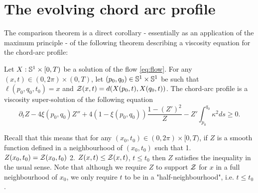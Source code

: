 \documentclass[a4paper, 12pt]{amsart}
\begin{document}
\section{The evolving chord arc profile}
\label{sec:evolving_chordarc}

The comparison theorem is a direct corollary - essentially as an application of the maximum principle - of the following theorem describing a viscosity equation for the chord-arc profile:

\begin{thm}
\label{thm:viscosity}
Let $X: \S^1\times [0,T)$ be a solution of the flow \eqref{eq:flow}. For any $(x,t) \in (0,2\pi)\times (0, T)$, let $(p_0,q_0) \in \S^1\times\S^1$ be such that $\ell(p_0,q_0, t_0) = x$ and $\chordarcprofile(x, t) = d(X(p_0, t), X(q_0, t))$. The chord-arc profile is a viscosity super-solution of the following equation
\[
\partial_tZ - 4 \xi(p_0, q_0) Z'' + 4(1-\xi(p_0,q_0)) \frac{1 - (Z')^2}{Z} - Z' \int_{p_0}^{q_0} \kappa^2 ds \geq 0.
\]
\end{thm}

Recall that this means that for any $(x_0,t_0) \in (0,2\pi)\times [0,T)$, if $Z$ is a smooth function defined in a neighbourhood of $(x_0,t_0)$ such that
1. $Z(x_0, t_0) = \chordarcprofile (x_0, t_0)$
2. $Z(x, t) \leq \chordarcprofile (x, t)$, $t\leq t_0$
then $Z$ satisfies the inequality in the usual sense. Note that although we require $Z$ to support $\chordarcprofile$ for $x$ in a full neighbourhood of $x_0$, we only require $t$ to be in a "half-neighbourhood", i.e. $t\leq t_0$.
\end{document}
